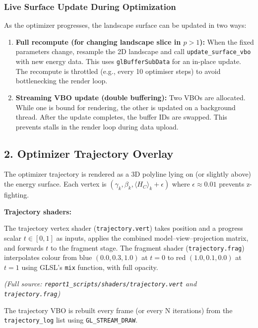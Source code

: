 \documentclass[
  11pt,
]{report}
\begin{document}
\subsubsection{Live Surface Update During
Optimization}\label{live-surface-update-during-optimization}

As the optimizer progresses, the landscape surface can be updated in two
ways:

\begin{enumerate}
\def\labelenumi{\arabic{enumi}.}
\item
  \textbf{Full recompute (for changing landscape slice in \(p > 1\)):}
  When the fixed parameters change, resample the 2D landscape and call
  \texttt{update\_surface\_vbo} with new energy data. This uses
  \texttt{glBufferSubData} for an in-place update. The recompute is
  throttled (e.g., every 10 optimiser steps) to avoid bottlenecking the
  render loop.
\item
  \textbf{Streaming VBO update (double buffering):} Two VBOs are
  allocated. While one is bound for rendering, the other is updated on a
  background thread. After the update completes, the buffer IDs are
  swapped. This prevents stalls in the render loop during data upload.
\end{enumerate}

\subsection{2. Optimizer Trajectory
Overlay}\label{optimizer-trajectory-overlay}

The optimizer trajectory is rendered as a 3D polyline lying on (or
slightly above) the energy surface. Each vertex is
\((\gamma_k, \beta_k, \langle H_C \rangle_k + \epsilon)\) where
\(\epsilon \approx 0.01\) prevents z-fighting.

\textbf{Trajectory shaders:}

The trajectory vertex shader (\texttt{trajectory.vert}) takes position
and a progress scalar \(t \in [0,1]\) as inputs, applies the combined
model--view--projection matrix, and forwards \(t\) to the fragment
stage. The fragment shader (\texttt{trajectory.frag}) interpolates
colour from blue \((0.0, 0.3, 1.0)\) at \(t = 0\) to red
\((1.0, 0.1, 0.0)\) at \(t = 1\) using GLSL's \texttt{mix} function,
with full opacity.

\emph{(Full source: \texttt{report1\_scripts/shaders/trajectory.vert}
and \texttt{trajectory.frag})}

The trajectory VBO is rebuilt every frame (or every N iterations) from
the \texttt{trajectory\_log} list using \texttt{GL\_STREAM\_DRAW}.
\end{document}
